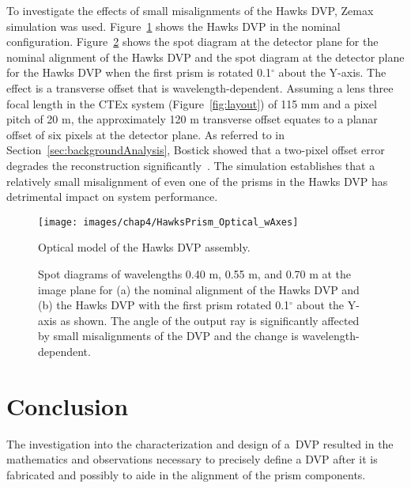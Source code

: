 To investigate the effects of small misalignments of the Hawks \ac{DVP}, Zemax simulation was used. Figure~\ref{fig:HawksPrism_Optical_wAxes} shows the Hawks \ac{DVP} in the nominal configuration. Figure~\ref{fig:sptDiagrams} shows the spot diagram at the detector plane for the nominal alignment of the Hawks \ac{DVP} and the spot diagram at the detector plane for the Hawks \ac{DVP} when the first prism is rotated 0.1$^\circ$ about the Y-axis. The effect is a transverse offset that is wavelength-dependent. Assuming a lens three focal length in the \ac{CTEx} system (Figure~\ref{fig:layout}) of 115 mm and a pixel pitch of 20 \textmu m, the approximately 120 \textmu m transverse offset equates to a planar offset of six pixels at the detector plane. As referred to in Section~\ref{sec:backgroundAnalysis}, Bostick showed that a two-pixel offset error degrades the reconstruction significantly~\cite{Bostick}. The simulation establishes that a relatively small misalignment of even one of the prisms in the Hawks \ac{DVP} has detrimental impact on system performance.

\begin{figure}[H]		%
\centering
\texttt{[image: images/chap4/HawksPrism\_Optical\_wAxes]}
\caption{Optical model of the Hawks DVP assembly.}
\label{fig:HawksPrism_Optical_wAxes}
\end{figure}

\begin{figure}[H]  %
\begin{center}
\caption{Spot diagrams of wavelengths 0.40 \textmu m, 0.55 \textmu m, and 0.70 \textmu m at the image plane for (a) the nominal alignment of the Hawks DVP and (b) the Hawks DVP with the first prism rotated 0.1$^\circ$ about the Y-axis as shown. The angle of the output ray is significantly affected by small misalignments of the DVP and the change is wavelength-dependent.}
\label{fig:sptDiagrams}
\end{center}
\end{figure}

\section{Conclusion}
\label{sec:dvpConclusion}

The investigation into the characterization and design of a~\ac{DVP} resulted in the mathematics and observations necessary to precisely define a \ac{DVP} after it is fabricated and possibly to aide in the alignment of the prism components.